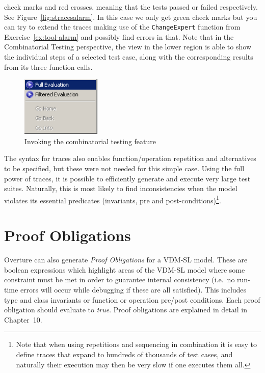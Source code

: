 check marks and red crosses, meaning that the tests passed or failed respectively.  See Figure~\ref{fig:stracesalarm}. In this case we only get green check marks but you can try to extend the traces making use of the \texttt{ChangeExpert} function from Exercise~\ref{ex:tool-alarm} and possibly find errors in that. Note that in the Combinatorial Testing perspective, the view in the lower region is able to show the individual steps of a selected test case, along with the corresponding results from its three function calls.
%
\begin{figure}[htbp]
\begin{center}
\includegraphics[width=1.5in]{figures/CToptions}
\caption{Invoking the combinatorial testing feature\label{fig:CToptions}}
\end{center}
\end{figure}
%
The syntax for traces also enables function/operation repetition and alternatives to be specified, but these were not needed for this simple case. Using the full power of traces, it is possible to efficiently generate and execute very large test suites. Naturally, this is most likely to find inconsistencies when the model violates its essential predicates (invariants, pre and post-conditions)\footnote{Note that when using repetitions and sequencing in combination it is easy to define traces that expand to hundreds of thousands of test cases, and naturally their execution may then be very slow if one executes them all.}.

\section{Proof Obligations}\label{sec:POtool}

Overture can also generate \emph{Proof Obligations} for a VDM-SL model. These are boolean expressions which highlight areas of the VDM-SL model where some constraint must be met in order to guarantee internal consistency (i.e.\ no run-time errors will occur while debugging if these are all satisfied). This includes type and class invariants or function or operation pre/post conditions. Each proof
obligation should evaluate to \emph{true}. Proof obligations are explained in detail in Chapter~10.

